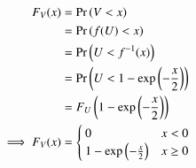 \documentclass[journal,12pt,twocolumn]{IEEEtran}
\renewcommand\thesection{\arabic{section}}
\begin{document}
\begin{enumerate}[label=\thesection.\arabic*
,ref=\thesection.\theenumi]
		\begin{align}
			F_V(x) &= \Pr\left(V < x\right)\\
			&= \Pr\left(f(U) < x\right)\\
			&= \Pr\left(U < f^{-1}(x)\right)\\
			&= \Pr\left(U < 1 - \exp{\left(-\frac{x}{2}\right)}\right)\\
			&= F_U\left(1 - \exp{\left(-\frac{x}{2}\right)}\right) \\
			\implies F_V(x) &= 
			\begin{cases}
				0 & x < 0 \\
				1 - \exp{\left(-\frac{x}{2}\right)} & x \geq 0
			\end{cases}
		\end{align}

\end{enumerate}
\end{document}

